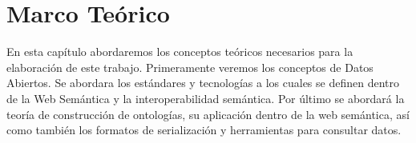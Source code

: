 \chapter{Marco Teórico}
\label{chap:Marco Teorico}

En esta capítulo abordaremos los conceptos teóricos necesarios para la elaboración de este trabajo. Primeramente veremos los conceptos de Datos Abiertos. Se abordara los estándares y tecnologías a los cuales se definen dentro de la Web Semántica y la interoperabilidad semántica. Por último se abordará la teoría de construcción de ontologías, su aplicación dentro de la web semántica, así como también los formatos de serialización y herramientas para consultar datos.






